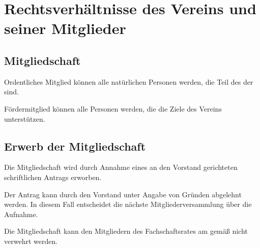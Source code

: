 \chapter{Rechtsverhältnisse des Vereins und seiner Mitglieder}

\section{Mitgliedschaft}\label{sec:mitgliedschaft}
\begin{absätze}
    \item Ordentliches Mitglied können alle natürlichen Personen werden, die Teil des \Fachbereich{} der \Uni{} sind.
    \item Fördermitglied können alle Personen werden, die die Ziele des Vereins unterstützen.
\end{absätze}

\section{Erwerb der Mitgliedschaft}\label{sec:erwerb_der_mitgliedschaft}
\begin{absätze}
    \item Die Mitgliedschaft wird durch Annahme eines an den Vorstand gerichteten schriftlichen Antrags erworben.
    \item Der Antrag kann durch den Vorstand unter Angabe von Gründen abgelehnt werden. In diesem Fall entscheidet die nächste Mitgliederversammlung über die Aufnahme.
    \item Die Mitgliedschaft kann den Mitgliedern des Fachschaftsrates am \Fachbereich{} gemäß \VerweisFachschaftsrat{} nicht verwehrt werden.
\end{absätze}

